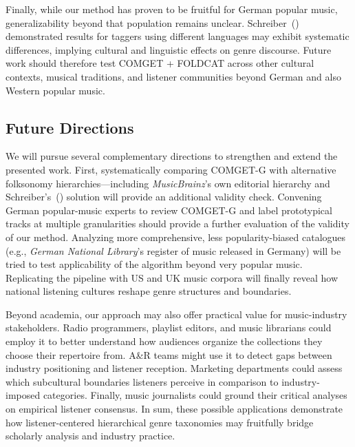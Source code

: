 \documentclass{article}
\begin{document}
Finally, while our method has proven to be fruitful for German popular music, generalizability beyond that population remains unclear. Schreiber~(\citeyear{schreiberImprovingGenreAnnotations2015}) demonstrated results for taggers using different languages may exhibit systematic differences, implying cultural and linguistic effects on genre discourse. Future work should therefore test COMGET + FOLDCAT across other cultural contexts, musical traditions, and listener communities beyond German and also Western popular music.

\subsection{Future Directions}

We will pursue several complementary directions to strengthen and extend the presented work. First, systematically comparing COMGET-G with alternative folksonomy hierarchies—including \textit{MusicBrainz}'s own editorial hierarchy and Schreiber's~(\citeyear{schreiberGenreOntologyLearning2016}) solution will provide an additional validity check. Convening German popular-music experts to review COMGET-G and label prototypical tracks at multiple granularities should provide a further evaluation of the validity of our method. Analyzing more comprehensive, less popularity-biased catalogues (e.g., \textit{German National Library}'s register of music released in Germany) will be tried to test applicability of the algorithm beyond very popular music. Replicating the pipeline with US and UK music corpora will finally reveal how national listening cultures reshape genre structures and boundaries.

Beyond academia, our approach may also offer practical value for music-industry stakeholders. Radio programmers, playlist editors, and music librarians could employ it to better understand how audiences organize the collections they choose their repertoire from. A\&R teams might use it to detect gaps between industry positioning and listener reception. Marketing departments could assess which subcultural boundaries listeners perceive in comparison to industry-imposed categories. Finally, music journalists could ground their critical analyses on empirical listener consensus. In sum, these possible applications demonstrate how listener-centered hierarchical genre taxonomies may fruitfully bridge scholarly analysis and industry practice.


\end{document}
